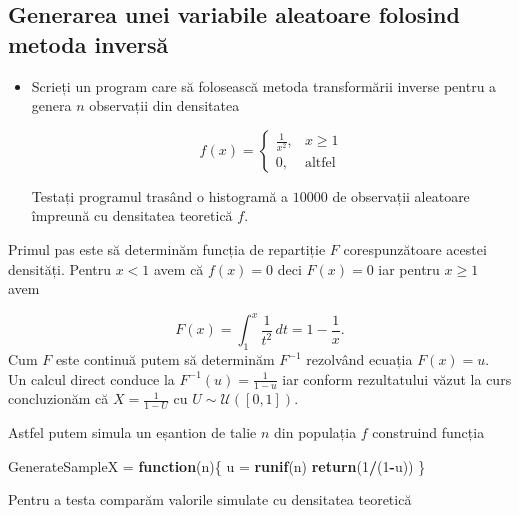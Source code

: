 \documentclass[]{article}
\newenvironment{Shaded}{\begin{snugshade}}{\end{snugshade}}
\newcommand{\KeywordTok}[1]{\textcolor[rgb]{0.13,0.29,0.53}{\textbf{#1}}}
\newcommand{\DecValTok}[1]{\textcolor[rgb]{0.00,0.00,0.81}{#1}}
\newcommand{\StringTok}[1]{\textcolor[rgb]{0.31,0.60,0.02}{#1}}
\newcommand{\ControlFlowTok}[1]{\textcolor[rgb]{0.13,0.29,0.53}{\textbf{#1}}}
\newcommand{\OperatorTok}[1]{\textcolor[rgb]{0.81,0.36,0.00}{\textbf{#1}}}
\newcommand{\NormalTok}[1]{#1}
\newenvironment{frshaded*}{%
  \def\FrameCommand{\fboxrule=\FrameRule\fboxsep=\FrameSep \fcolorbox{framecolor}{shadecolor1}}%
  \MakeFramed {\advance\hsize-\width \FrameRestore}}%
{\endMakeFramed}
\newenvironment{rmdblock}[1]
  {\begin{frshaded*}
  \begin{itemize}
  \renewcommand{\labelitemi}{
    \raisebox{-.7\height}[0pt][0pt]{
      {\setkeys{Gin}{width=2em,keepaspectratio}\texttt{[image: images/icons/\#1]}}
    }
  }
  \item
  }
  {
  \end{itemize}
  \end{frshaded*}
  }
\newenvironment{rmdexercise}
  {\begin{rmdblock}{exercise}}
  {\end{rmdblock}}
\begin{document}
\subsection{Generarea unei variabile aleatoare folosind metoda
inversă}\label{generarea-unei-variabile-aleatoare-folosind-metoda-inversa}

\begin{rmdexercise}
Scrieți un program care să folosească metoda transformării inverse
pentru a genera \(n\) observații din densitatea

\[
  f(x) = \left\{\begin{array}{ll}
        \frac{1}{x^2}, & x\geq 1\\
        0, & \text{altfel}
  \end{array}\right.
\]

Testați programul trasând o histogramă a \(10000\) de observații
aleatoare împreună cu densitatea teoretică \(f\).
\end{rmdexercise}

Primul pas este să determinăm funcția de repartiție \(F\)
corespunzătoare acestei densități. Pentru \(x<1\) avem că \(f(x)=0\)
deci \(F(x)=0\) iar pentru \(x\geq 1\) avem

\[
  F(x) = \int_{1}^{x}\frac{1}{t^2}\, dt = 1 - \frac{1}{x}.
\] Cum \(F\) este continuă putem să determinăm \(F^{-1}\) rezolvând
ecuația \(F(x)=u\). Un calcul direct conduce la
\(F^{-1}(u)=\frac{1}{1-u}\) iar conform rezultatului văzut la curs
concluzionăm că \(X = \frac{1}{1-U}\) cu \(U\sim \mathcal{U}([0,1])\).

Astfel putem simula un eșantion de talie \(n\) din populația \(f\)
construind funcția

\begin{Shaded}
\begin{Highlighting}[]
\NormalTok{GenerateSampleX =}\StringTok{ }\ControlFlowTok{function}\NormalTok{(n)\{}
\NormalTok{  u =}\StringTok{ }\KeywordTok{runif}\NormalTok{(n)}
  \KeywordTok{return}\NormalTok{(}\DecValTok{1}\OperatorTok{/}\NormalTok{(}\DecValTok{1}\OperatorTok{-}\NormalTok{u))}
\NormalTok{\}}
\end{Highlighting}
\end{Shaded}

Pentru a testa comparăm valorile simulate cu densitatea teoretică
\end{document}
